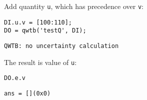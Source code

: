 Add quantity \texttt{u}, which has precedence over \texttt{v}:

\begin{lstlisting}
DI.u.v = [100:110];
DO = qwtb('testQ', DI);
\end{lstlisting}
\begin{lstlisting}[language={},xleftmargin=5pt,frame=none]
QWTB: no uncertainty calculation

\end{lstlisting}


The result is value of \texttt{u}:

\begin{lstlisting}
DO.e.v
\end{lstlisting}
\begin{lstlisting}[language={},xleftmargin=5pt,frame=none]
ans = [](0x0)

\end{lstlisting}


\stopcontents[localtoc]
